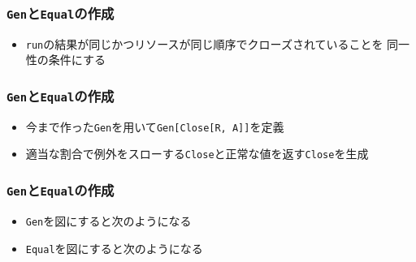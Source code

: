 \begin{frame}
  \frametitle{\protect\lstinline|Gen|と\protect\lstinline|Equal|の作成}

  

  \begin{itemize}
    \item<2-> \lstinline|run|の結果が同じかつリソースが同じ順序でクローズされていることを
    同一性の条件にする
  \end{itemize}
\end{frame}

\begin{frame}
  \frametitle{\protect\lstinline|Gen|と\protect\lstinline|Equal|の作成}

  

  \begin{itemize}
    \item<2-> 今まで作った\lstinline|Gen|を用いて\lstinline|Gen[Close[R, A]]|を定義
    \item<3-> 適当な割合で例外をスローする\lstinline|Close|と正常な値を返す\lstinline|Close|を生成
  \end{itemize}
\end{frame}

\begin{frame}
  \frametitle{\protect\lstinline|Gen|と\protect\lstinline|Equal|の作成}

  \begin{itemize}
    \item<1-> \lstinline|Gen|を図にすると次のようになる
    \begin{center}
    \end{center}

    \item<3-> \lstinline|Equal|を図にすると次のようになる
    \begin{center}
    \end{center}
  \end{itemize}
\end{frame}

